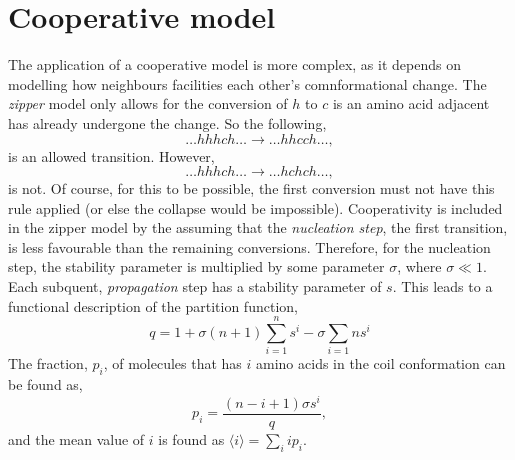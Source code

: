 \documentclass[a4paper]{article}
\begin{document}
\section{Cooperative model}

The application of a cooperative model is more complex, as it depends on modelling how neighbours facilities each other's comnformational change. 
The \emph{zipper} model only allows for the conversion of $h$ to $c$ is an amino acid adjacent has already undergone the change. 
So the following, 
%
\begin{equation*}
    \ldots hhhch \ldots \rightarrow \ldots hhcch \ldots, 
\end{equation*}
%
is an allowed transition. 
However, 
%
\begin{equation*}
    \ldots hhhch \ldots \rightarrow \ldots hchch \ldots, 
\end{equation*}
%
is not.
Of course, for this to be possible, the first conversion must not have this rule applied (or else the collapse would be impossible). 
Cooperativity is included in the zipper model by the assuming that the \emph{nucleation step}, the first transition, is less favourable than the remaining conversions. 
Therefore, for the nucleation step, the stability parameter is multiplied by some parameter $\sigma$, where $\sigma \ll 1$.
Each subquent, \emph{propagation} step has a stability parameter of $s$. 
This leads to a functional description of the partition function, 
%
\begin{equation}
    q = 1 + \sigma(n + 1)\sum_{i=1}^{n}s^i - \sigma\sum_{i=1}{n}s^i
\end{equation}
%
The fraction, $p_i$, of molecules that has $i$ amino acids in the coil conformation can be found as, 
%
\begin{equation}
    p_i = \frac{(n - i + 1) \sigma s^i}{q},
\end{equation}
and the mean value of $i$ is found as $\langle i \rangle = \sum_i ip_i$. 



\end{document}
